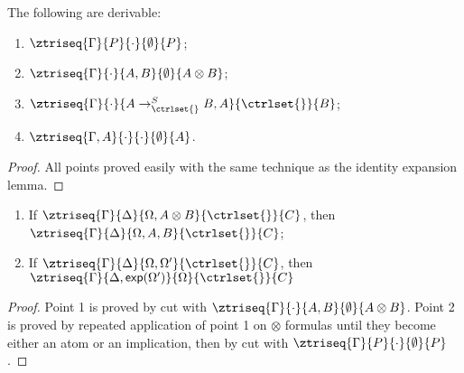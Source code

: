 \begin{lemma}\label{idhelplemma}
  The following are derivable:
  \begin{enumerate}
  \item $\ztriseq{\Gamma}{P}{\cdot}{\emptyset}{P}$;
  \item $\ztriseq{\Gamma}{\cdot}{A, B}{\emptyset}{A \otimes B}$;
  \item $\ztriseq{\Gamma}{\cdot}{A \rightarrow_{\ctrlset{}}^S B,
      A}{\ctrlset{}}{B}$;
  \item $\ztriseq{\Gamma, A}{\cdot}{\cdot}{\emptyset}{A}$.
  \end{enumerate}
\end{lemma}
\begin{proof}
  All points proved easily with the same technique as the identity expansion
  lemma.
\end{proof}

\begin{lemma}\label{activeinversion}\mbox{}
  \begin{enumerate}
  \item If $\ztriseq{\Gamma}{\Delta}{\Omega, A \otimes B}{\ctrlset{}}{C}$, then
    $\ztriseq{\Gamma}{\Delta}{\Omega, A, B}{\ctrlset{}}{C}$;
  \item If $\ztriseq{\Gamma}{\Delta}{\Omega, \Omega'}{\ctrlset{}}{C}$, then
    $\ztriseq{\Gamma}{\Delta, \textsf{exp}(\Omega')}{\Omega}{\ctrlset{}}{C}$
  \end{enumerate}
\end{lemma}
\begin{proof}
  Point 1 is proved by cut with
  $\ztriseq{\Gamma}{\cdot}{A, B}{\emptyset}{A \otimes B}$. Point 2 is proved by
  repeated application of point 1 on $\otimes$ formulas until they become either
  an atom or an implication, then by cut with
  $\ztriseq{\Gamma}{P}{\cdot}{\emptyset}{P}$.
\end{proof}

